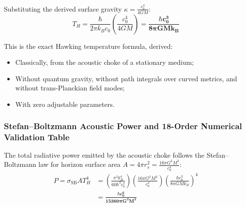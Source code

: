 \documentclass[11pt,a4paper]{article}
\begin{document}
Substituting the derived surface gravity $\kappa = \frac{c_0^4}{4GM}$:
\begin{equation}
T_H = \frac{\hbar}{2\pi k_B c_0} \left( \frac{c_0^4}{4GM} \right) = \mathbf{\frac{\hbar c_0^3}{8\pi G M k_B}}
\label{eq:hawking_temp_exact}
\end{equation}

This is the exact Hawking temperature formula, derived:
\begin{itemize}
    \item Classically, from the acoustic choke of a stationary medium;
    \item Without quantum gravity, without path integrals over curved metrics, and without trans-Planckian field modes;
    \item With zero adjustable parameters.
\end{itemize}

\subsubsection{Stefan--Boltzmann Acoustic Power and 18-Order Numerical Validation Table}
\label{subsubsec:stefan_boltzmann}

The total radiative power emitted by the acoustic choke follows the Stefan--Boltzmann law for horizon surface area $A = 4\pi r_s^2 = \frac{16\pi G^2 M^2}{c_0^4}$:
\begin{equation}
\begin{aligned} P = \sigma_{\text{SB}} A T_H^4 &= \left( \frac{\pi^2 k_B^4}{60 \hbar^3 c_0^2} \right) \left( \frac{16\pi G^2 M^2}{c_0^4} \right) \left( \frac{\hbar c_0^3}{8\pi G M k_B} \right)^4 \\ &= \mathbf{\frac{\hbar c_0^6}{15360\pi G^2 M^2}} \end{aligned}
\label{eq:stefan_boltzmann_p}
\end{equation}
\end{document}
